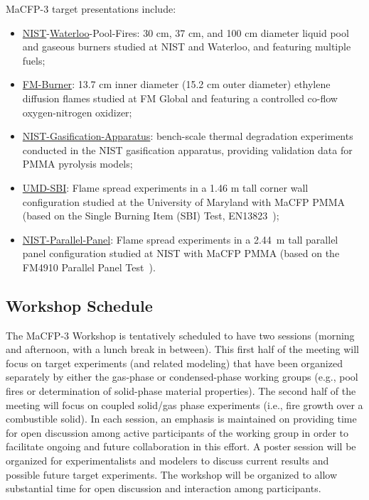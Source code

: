 \documentclass[12pt]{article}
\begin{document}
MaCFP-3 target presentations include:
\begin{itemize}[noitemsep]
\item \href{https://github.com/MaCFP/macfp-db/tree/master/Liquid_Pool_Fires/NIST_Pool_Fires}{NIST}-\href{https://github.com/MaCFP/macfp-db/tree/master/Liquid_Pool_Fires/Waterloo_Methanol}{Waterloo}-Pool-Fires: 30 cm, 37 cm, and 100 cm diameter liquid pool and gaseous burners studied at NIST and Waterloo, and featuring multiple fuels;
\item \href{https://github.com/MaCFP/macfp-db/tree/master/Extinction/FM_Burner}{FM-Burner}: 13.7 cm inner diameter (15.2 cm outer diameter) ethylene diffusion flames studied at FM Global and featuring a controlled co-flow oxygen-nitrogen oxidizer;
\item \href{https://github.com/MaCFP/matl-db/tree/master/PMMA/Validation_Data/NIST_Gasification_Apparatus}{NIST-Gasification-Apparatus}: bench-scale thermal degradation experiments conducted in the NIST gasification apparatus, providing validation data for PMMA pyrolysis models;
\item \href{https://github.com/MaCFP/macfp-db/tree/master/Fire_Growth/UMD_SBI}{UMD-SBI}: Flame spread experiments in a 1.46 m tall corner wall configuration studied at the University of Maryland with MaCFP PMMA (based on the Single Burning Item (SBI) Test, EN13823~\cite{EN-13823standard});
\item \href{https://github.com/MaCFP/macfp-db/tree/master/Fire_Growth/NIST_Parallel_Panel}{NIST-Parallel-Panel}: Flame spread experiments in a 2.44~m tall parallel panel configuration studied at NIST with MaCFP PMMA (based on the FM4910 Parallel Panel Test~\cite{tewarson2001flammability,FM-4910standard}).
\end{itemize}


\subsection{Workshop Schedule}

The MaCFP-3 Workshop is tentatively scheduled to have two sessions (morning and afternoon, with a lunch break in between). This first half of the meeting will focus on target experiments (and related modeling) that have been organized separately by either the gas-phase or condensed-phase working groups (e.g., pool fires or determination of solid-phase material properties). The second half of the meeting will focus on coupled solid/gas phase experiments (i.e., fire growth over a combustible solid). In each session, an emphasis is maintained on providing time for open discussion among active participants of the working group in order to facilitate ongoing and future collaboration in this effort. A poster session will be organized for experimentalists and modelers to discuss current results and possible future target experiments. The workshop will be organized to allow substantial time for open discussion and interaction among participants.\\
\end{document}
